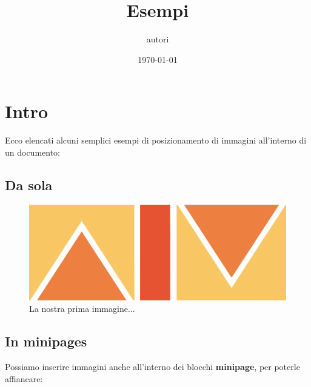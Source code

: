 \documentclass{article}
\title{Esempi}
\author{autori}
\date{\today}
\begin{document}
 
	\maketitle
	\tableofcontents 
	
\section{Intro}

	Ecco elencati alcuni semplici esempi di posizionamento di immagini all'interno di un documento:
	
\subsection{Da sola}

\begin{figure}[h]
	\centering
	\includegraphics[width=0.5\linewidth]{AIM}
	\caption{La nostra prima immagine...}
	\label{img:logo}
\end{figure}

\clearpage

\subsection{In minipages}

Possiamo inserire immagini anche all'interno dei blocchi \textbf{minipage}, per poterle affiancare:
\bigskip
\end{document}
